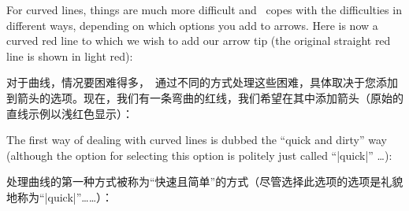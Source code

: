 For curved lines, things are much more difficult and \tikzname\ copes with the
difficulties in different ways, depending on which options you add to arrows.
Here is now a curved red line to which we wish to add our arrow tip (the
original straight red line is shown in light red):

对于曲线，情况要困难得多，\tikzname\ 通过不同的方式处理这些困难，具体取决于您添加到箭头的选项。现在，我们有一条弯曲的红线，我们希望在其中添加箭头（原始的直线示例以浅红色显示）：
%
\begin{codeexample}[]
\end{codeexample}

The first way of dealing with curved lines is dubbed the ``quick and dirty''
way (although the option for selecting this option is politely just called
``|quick|'' \dots):

处理曲线的第一种方式被称为“快速且简单”的方式（尽管选择此选项的选项是礼貌地称为“|quick|”……）：

